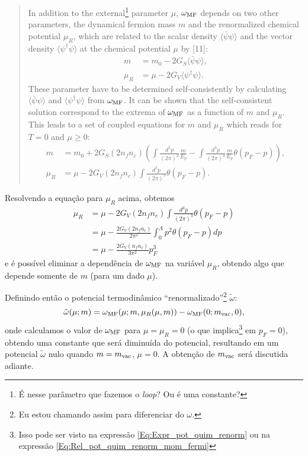 \begin{quote}
	In addition to the external\footnote{É nesse parâmetro que fazemos o \emph{loop}? Ou é uma constante?} parameter $\mu$, $\omega_{\rm{MF}}$ depends on two other parameters, the dynamical fermion mass $m$ and the renormalized chemical potential $\mu_R$, which are related to the scalar density $\langle\bar{\psi}\psi\rangle$ and the vector density $\langle\psi^\dagger\psi\rangle$ at the chemical potential $\mu$ by [11]:
	\begin{align}
		m &= m_0 - 2G_S\langle\bar{\psi}\psi\rangle, \label{Eq:Eq_Gap_Buballa_1}\\
		\mu_R &= \mu - 2G_V\langle\psi^\dagger\psi\rangle.
	\end{align}
	These parameter have to be determined self-consistently by calculating $\langle\bar{\psi}\psi\rangle$ and $\langle\psi^\dagger\psi\rangle$ from $\omega_{\rm{MF}}$. It can be shown that the self-consistent solution correspond to the extrema of $\omega_{\rm{MF}}$ as a function of $m$ and $\mu_R$. This leads to a set of coupled equations for $m$ and $\mu_R$ which reads for $T = 0$ and $\mu \geqslant 0$:
\begin{align}
	m &= m_0 + 2G_S(2n_fn_c)\left(\int \frac{d^3p}{(2\pi)^3} \frac{m}{E_p} - \int \frac{d^3p}{(2\pi)^3}\frac{m}{E_p}\theta(p_F - p)\right), \label{Eq:Eq_Gap_Buballa_2}\\
	\mu_R &= \mu - 2G_V(2n_fn_c)\int\frac{d^3p}{(2\pi)^3}\theta(p_F - p).
\end{align}
\end{quote}

Resolvendo a equação para $\mu_R$ acima, obtemos
\begin{align}
	\mu_R &= \mu - 2G_V(2n_fn_c)\int\frac{d^3p}{(2\pi)^3}\theta(p_F - p) \\
	&= \mu - \frac{2G_V(2n_fn_c)}{2\pi^2}\int_0^\Lambda p^2 \theta(p_F - p) dp \\
	&= \mu - \frac{2G_V(n_fn_c)}{3\pi^2}p_F^3 \label{Eq:Expr_pot_quim_renorm}
\end{align}
%
e é possível eliminar a dependência de $\omega_{\rm{MF}}$ na variável $\mu_R$, obtendo algo que depende somente de $m$ (para um dado $\mu$).

Definindo então o potencial termodinâmico ``renormalizado''\footnote{Eu estou chamando assim para diferenciar do $\omega$.} $\tilde\omega$:
\begin{equation}\label{Eq:Def_omega_tilde}
	\tilde{\omega}(\mu;m) = \omega_{\rm{MF}}(\mu; m, \mu_R(\mu,m)) - \omega_{\rm{MF}}(0; m_{\rm{vac}}, 0),
\end{equation}
%
onde calculamos o valor de $\omega_{\rm{MF}}$ para $\mu = \mu_R = 0$ (o que implica\footnote{Isso pode ser visto na expressão \eqref{Eq:Expr_pot_quim_renorm} ou na expressão \eqref{Eq:Rel_pot_quim_renorm_mom_fermi}} em $p_F = 0$), obtendo uma constante que será diminuída do potencial, resultando em um potencial $\tilde\omega$ nulo quando $m = m_{\rm{vac}}$, $\mu = 0$. A obtenção de $m_{\rm{vac}}$ será discutida adiante.

